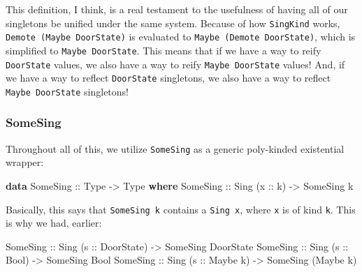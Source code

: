\documentclass[]{article}
\newenvironment{Shaded}{}{}
\newcommand{\DataTypeTok}[1]{\textcolor[rgb]{0.56,0.13,0.00}{#1}}
\newcommand{\KeywordTok}[1]{\textcolor[rgb]{0.00,0.44,0.13}{\textbf{#1}}}
\newcommand{\NormalTok}[1]{#1}
\newcommand{\OtherTok}[1]{\textcolor[rgb]{0.00,0.44,0.13}{#1}}
\begin{document}
This definition, I think, is a real testament to the usefulness of having all of
our singletons be unified under the same system. Because of how
\texttt{SingKind} works, \texttt{Demote\ (Maybe\ DoorState)} is evaluated to
\texttt{Maybe\ (Demote\ DoorState)}, which is simplified to
\texttt{Maybe\ DoorState}. This means that if we have a way to reify
\texttt{DoorState} values, we also have a way to reify \texttt{Maybe\ DoorState}
values! And, if we have a way to reflect \texttt{DoorState} singletons, we also
have a way to reflect \texttt{Maybe\ DoorState} singletons!

\subsubsection{SomeSing}\label{somesing}

Throughout all of this, we utilize \texttt{SomeSing} as a generic poly-kinded
existential wrapper:

\begin{Shaded}
\begin{Highlighting}[]
\KeywordTok{data} \DataTypeTok{SomeSing}\OtherTok{ ::} \DataTypeTok{Type} \OtherTok{{-}\textgreater{}} \DataTypeTok{Type} \KeywordTok{where}
    \DataTypeTok{SomeSing}\OtherTok{ ::} \DataTypeTok{Sing}\NormalTok{ (}\OtherTok{x ::}\NormalTok{ k) }\OtherTok{{-}\textgreater{}} \DataTypeTok{SomeSing}\NormalTok{ k}
\end{Highlighting}
\end{Shaded}

Basically, this says that \texttt{SomeSing\ k} contains a \texttt{Sing\ x},
where \texttt{x} is of kind \texttt{k}. This is why we had, earlier:

\begin{Shaded}
\begin{Highlighting}[]
\DataTypeTok{SomeSing}\OtherTok{ ::} \DataTypeTok{Sing}\NormalTok{ (}\OtherTok{s ::} \DataTypeTok{DoorState}\NormalTok{) }\OtherTok{{-}\textgreater{}} \DataTypeTok{SomeSing} \DataTypeTok{DoorState}
\DataTypeTok{SomeSing}\OtherTok{ ::} \DataTypeTok{Sing}\NormalTok{ (}\OtherTok{s ::} \DataTypeTok{Bool}\NormalTok{)      }\OtherTok{{-}\textgreater{}} \DataTypeTok{SomeSing} \DataTypeTok{Bool}
\DataTypeTok{SomeSing}\OtherTok{ ::} \DataTypeTok{Sing}\NormalTok{ (}\OtherTok{s ::} \DataTypeTok{Maybe}\NormalTok{ k)   }\OtherTok{{-}\textgreater{}} \DataTypeTok{SomeSing}\NormalTok{ (}\DataTypeTok{Maybe}\NormalTok{ k)}
\end{Highlighting}
\end{Shaded}
\end{document}
